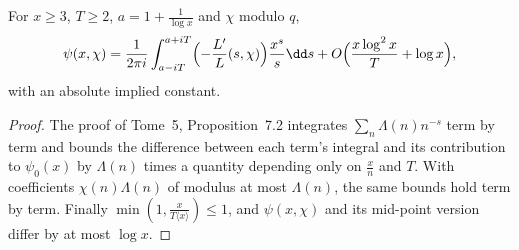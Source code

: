 \begin{lemma}\label{lem:perronchi}
For $x\ge3$, $T\ge2$, $a=1+\frac1{\log x}$ and $\chi$ modulo $q$,
\[
\psi(x,\chi)=\frac1{2\pi i}\int_{a-iT}^{a+iT}\Bigl(-\frac{L'}L(s,\chi)\Bigr)\frac{x^s}s\dd s+O\Bigl(\frac{x\log^2x}T+\log x\Bigr),
\]
with an absolute implied constant.
\end{lemma}
\begin{proof}
The proof of Tome~5, Proposition~7.2 integrates $\sum_n\Lambda(n)n^{-s}$ term by term and bounds the difference between each term's integral and its contribution to $\psi_0(x)$ by $\Lambda(n)$ times a quantity depending only on $\frac xn$ and $T$. With coefficients $\chi(n)\Lambda(n)$ of modulus at most $\Lambda(n)$, the same bounds hold
term by term. Finally $\min(1,\frac x{T\langle x\rangle})\le1$, and $\psi(x,\chi)$ and its mid-point version differ by at most $\log x$.
\end{proof}

